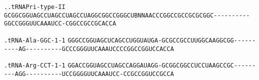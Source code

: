 \documentclass{article}
\newcommand{\rnabox}[1]{\colorbox{#1}{\texttt{#1}}}
\begin{document}
\texttt{..tRNAPri-type-II}
\rnabox{G}\rnabox{C}\rnabox{G}\rnabox{G}\rnabox{C}\rnabox{G}\rnabox{G}\rnabox{U}\rnabox{A}\rnabox{G}\rnabox{C}\rnabox{C}\rnabox{U}\rnabox{A}\rnabox{G}\rnabox{C}\rnabox{C}\rnabox{U}\rnabox{A}\rnabox{G}\rnabox{C}\rnabox{C}\rnabox{U}\rnabox{A}\rnabox{G}\rnabox{G}\rnabox{C}\rnabox{G}\rnabox{G}\rnabox{C}\rnabox{C}\rnabox{G}\rnabox{G}\rnabox{G}\rnabox{C}\rnabox{U}\rnabox{B}\rnabox{N}\rnabox{N}\rnabox{A}\rnabox{A}\rnabox{C}\rnabox{C}\rnabox{C}\rnabox{G}\rnabox{G}\rnabox{C}\rnabox{C}\rnabox{G}\rnabox{C}\rnabox{C}\rnabox{G}\rnabox{C}\rnabox{G}\rnabox{C}\rnabox{G}\rnabox{G}\rnabox{C}\rnabox{-}\rnabox{-}\rnabox{-}\rnabox{-}\rnabox{-}\rnabox{-}\rnabox{-}\rnabox{-}\rnabox{-}\rnabox{-}\rnabox{G}\rnabox{G}\rnabox{C}\rnabox{C}\rnabox{G}\rnabox{G}\rnabox{G}\rnabox{U}\rnabox{U}\rnabox{C}\rnabox{A}\rnabox{A}\rnabox{A}\rnabox{U}\rnabox{C}\rnabox{C}\rnabox{-}\rnabox{C}\rnabox{G}\rnabox{G}\rnabox{C}\rnabox{C}\rnabox{G}\rnabox{C}\rnabox{C}\rnabox{G}\rnabox{C}\rnabox{A}\rnabox{C}\rnabox{C}\rnabox{A}

\vspace{-0.5mm}

\texttt{.tRNA-Ala-GGC-1-1}
\rnabox{G}\rnabox{G}\rnabox{G}\rnabox{C}\rnabox{C}\rnabox{G}\rnabox{G}\rnabox{U}\rnabox{A}\rnabox{G}\rnabox{C}\rnabox{U}\rnabox{C}\rnabox{A}\rnabox{G}\rnabox{C}\rnabox{C}\rnabox{U}\rnabox{G}\rnabox{G}\rnabox{U}\rnabox{A}\rnabox{U}\rnabox{G}\rnabox{A}\rnabox{-}\rnabox{G}\rnabox{C}\rnabox{G}\rnabox{C}\rnabox{C}\rnabox{G}\rnabox{C}\rnabox{C}\rnabox{U}\rnabox{U}\rnabox{G}\rnabox{G}\rnabox{C}\rnabox{A}\rnabox{A}\rnabox{G}\rnabox{G}\rnabox{C}\rnabox{G}\rnabox{G}\rnabox{-}\rnabox{-}\rnabox{-}\rnabox{-}\rnabox{-}\rnabox{-}\rnabox{-}\rnabox{-}\rnabox{-}\rnabox{-}\rnabox{A}\rnabox{G}\rnabox{-}\rnabox{-}\rnabox{-}\rnabox{-}\rnabox{-}\rnabox{-}\rnabox{-}\rnabox{-}\rnabox{-}\rnabox{-}\rnabox{G}\rnabox{C}\rnabox{C}\rnabox{C}\rnabox{G}\rnabox{G}\rnabox{G}\rnabox{U}\rnabox{U}\rnabox{C}\rnabox{A}\rnabox{A}\rnabox{A}\rnabox{U}\rnabox{C}\rnabox{C}\rnabox{C}\rnabox{C}\rnabox{G}\rnabox{G}\rnabox{C}\rnabox{C}\rnabox{G}\rnabox{G}\rnabox{U}\rnabox{C}\rnabox{C}\rnabox{A}\rnabox{C}\rnabox{C}\rnabox{A}

\vspace{-0.5mm}

\texttt{.tRNA-Arg-CCT-1-1}
\rnabox{G}\rnabox{G}\rnabox{A}\rnabox{C}\rnabox{C}\rnabox{G}\rnabox{G}\rnabox{U}\rnabox{A}\rnabox{G}\rnabox{C}\rnabox{C}\rnabox{U}\rnabox{A}\rnabox{G}\rnabox{C}\rnabox{C}\rnabox{A}\rnabox{G}\rnabox{G}\rnabox{A}\rnabox{U}\rnabox{A}\rnabox{G}\rnabox{G}\rnabox{-}\rnabox{G}\rnabox{C}\rnabox{G}\rnabox{G}\rnabox{C}\rnabox{G}\rnabox{G}\rnabox{C}\rnabox{C}\rnabox{U}\rnabox{C}\rnabox{C}\rnabox{U}\rnabox{A}\rnabox{A}\rnabox{G}\rnabox{C}\rnabox{C}\rnabox{G}\rnabox{C}\rnabox{-}\rnabox{-}\rnabox{-}\rnabox{-}\rnabox{-}\rnabox{-}\rnabox{-}\rnabox{-}\rnabox{-}\rnabox{A}\rnabox{G}\rnabox{G}\rnabox{-}\rnabox{-}\rnabox{-}\rnabox{-}\rnabox{-}\rnabox{-}\rnabox{-}\rnabox{-}\rnabox{-}\rnabox{-}\rnabox{U}\rnabox{C}\rnabox{C}\rnabox{G}\rnabox{G}\rnabox{G}\rnabox{G}\rnabox{U}\rnabox{U}\rnabox{C}\rnabox{A}\rnabox{A}\rnabox{A}\rnabox{U}\rnabox{C}\rnabox{C}\rnabox{-}\rnabox{C}\rnabox{C}\rnabox{G}\rnabox{C}\rnabox{C}\rnabox{G}\rnabox{G}\rnabox{U}\rnabox{C}\rnabox{C}\rnabox{G}\rnabox{C}\rnabox{C}\rnabox{A}
\end{document}
